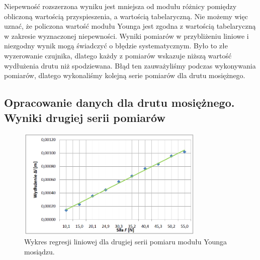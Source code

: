 \documentclass [a4paper,11pt]{article}
\begin{document}
\begin{enumerate}[label=\alph*)]
		Niepewność rozszerzona wyniku jest mniejsza od modułu różnicy pomiędzy obliczoną wartością przyspieszenia, a wartością tabelaryczną. Nie możemy więc uznać, że policzona wartość modułu Younga jest zgodna z wartością tabelaryczną w zakresie wyznaczonej niepewności. Wyniki pomiarów w przybliżeniu liniowe i niezgodny wynik mogą świadczyć o błędzie systematycznym. Było to złe wyzerowanie czujnika, dlatego każdy z pomiarów wskazuje niższą wartość wydłużenia drutu niż spodziewana. Błąd ten zauważyliśmy podczas wykonywania pomiarów, dlatego wykonaliśmy kolejną serie pomiarów dla drutu mosiężnego.
		
	\end{enumerate}

	\subsection{Opracowanie danych dla drutu mosiężnego. Wyniki drugiej serii pomiarów}
	
	\begin{figure}[!h]
		\centering
		\includegraphics[width=0.8\textwidth]{wykmosiadz2}
		\caption{Wykres regresji liniowej dla drugiej serii pomiaru modułu Younga mosiądzu.}
		\label{fig:wykmosiadz2}
	\end{figure}
	
\end{document}
